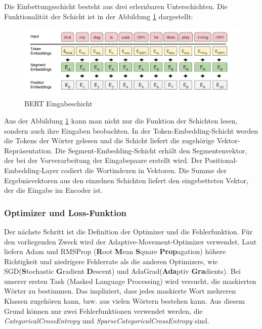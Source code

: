 Die Einbettungsschicht besteht aus drei erlernbaren Unterschichten. Die Funktionalität der Schicht ist in der Abbildung \ref{embl} dargestellt:

\begin{figure}
	\centering
	\includegraphics[scale=0.35]{images/bert_embedding_layer.png}
	\caption{BERT Eingabeschicht \cite{BERT:19}}
	\label{embl}
\end{figure}

Aus der Abbildung \ref{embl} kann man nicht nur die Funktion der Schichten lesen, sondern auch ihre Eingaben beobachten. In der Token-Embedding-Schicht werden die Tokens der Wörter gelesen und die Schicht liefert die zugehörige Vektor-Repräsentation. Die Segment-Embedding-Schicht erhält den Segmentenvektor, der bei der Vorverarbeitung der Eingabepaare erstellt wird. Der Positional-Embedding-Layer codiert die Wortindexen in Vektoren. Die Summe der Ergebnisvektoren aus den einzelnen Schichten liefert den eingebetteten Vektor, der die Eingabe im Encoder ist. 

\subsubsection{Optimizer und Loss-Funktion}\label{optimizer_and_loss}
Der nächste Schritt ist die Definition der Optimizer und die Fehlerfunktion. Für den vorliegenden Zweck wird der Adaptive-Movement-Optimizer verwendet. Laut \cite{CO:19} liefern Adam und RMSProp (\textbf{R}oot \textbf{M}ean \textbf{S}quare \textbf{Prop}agation) höhere Richtigkeit und niedrigere Fehlerrate als die anderen Optimizers, wie SGD(\textbf{S}tochastic \textbf{G}radient \textbf{D}escent) und AdaGrad(\textbf{Ada}ptiv \textbf{Gra}dients).  
Bei unserer ersten Task (Masked Language Processing) wird versucht, die maskierten Wörter zu bestimmen. Das impliziert, dass jedes maskierte Wort mehreren Klassen zugehören kann, bzw. aus vielen Wörtern bestehen kann. Aus diesem Grund können nur zwei Fehlerfunktionen verwendet werden, die \textit{CategoricalCrossEntropy} und \textit{SparseCategoricalCrossEntropy} sind.

